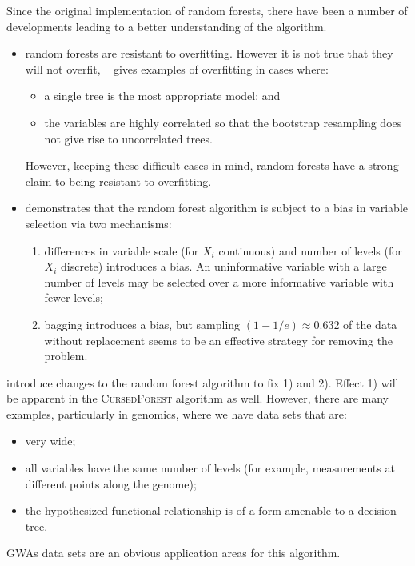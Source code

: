 \documentclass[10pt,letterpaper]{article}
\newcommand{\cursedforest}{\textsc{CursedForest}\xspace}
\begin{document}
Since the original implementation of random forests, there have been a number of developments leading to a better
understanding of the algorithm.
\begin{itemize}
\item random forests are resistant to overfitting. However it is not true that they will not overfit,
  ~\cite{Segal.2004} gives examples of overfitting in cases where:
  \begin{itemize}
  \item a single tree is the most appropriate model; and
  \item the variables are highly correlated so that the bootstrap resampling does not give rise to uncorrelated trees.
  \end{itemize}
However, keeping these difficult cases in mind, random forests have a strong claim to being resistant to overfitting.
\item \cite{Strobl.et.al.2007} demonstrates that the random forest algorithm is subject to a bias in variable selection
  via two mechanisms:
  \begin{enumerate}
  \item differences in variable scale (for $X_i$ continuous) and number of levels (for $X_i$ discrete) introduces a
    bias. An uninformative variable with a large number of levels may be selected over a more informative variable with
    fewer levels;
  \item bagging introduces a bias, but sampling $(1- 1/e) \approx 0.632$ of the data without replacement seems to be an
    effective strategy for removing the problem.
  \end{enumerate}
\end{itemize} 

\cite{Strobl.et.al.2007} introduce changes to the random forest algorithm to fix 1) and 2).  Effect 1) will be apparent
in the \cursedforest algorithm as well.  However, there are many examples, particularly in genomics, where we have data
sets that are:
\begin{itemize}
\item very wide;
\item all variables have the same number of levels (for example, measurements at different points along the genome);
\item the hypothesized functional relationship is of a form amenable to a decision tree.
\end{itemize}
GWAs data sets are an obvious application areas for this algorithm. 
\end{document}
